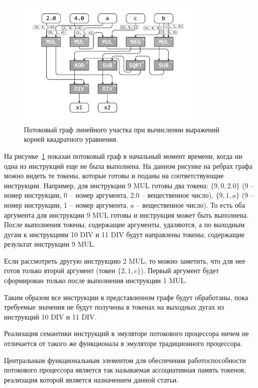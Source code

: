\documentclass[
11pt,%
tightenlines,%
twoside,%
onecolumn,%
nofloats,%
nobibnotes,%
nofootinbib,%
superscriptaddress,%
noshowpacs,%
centertags]%
{revtex4}
\begin{document}
\begin{figure}[h]
\setcaptionmargin{5mm}
\onelinecaptionsfalse %
\includegraphics[width=0.80\textwidth]{pics/dataflow.pdf}
\caption{Потоковый граф линейного участка при вычислении выражений\\ корней квадратного уравнения.}\label{fig:dataflow}
\end{figure}

На рисунке~\ref{fig:dataflow} показан потоковый граф в начальный момент времени, когда ни одна из инструкций еще не была выполнена.
На данном рисунке на ребрах графа можно видеть те токены, которые готовы и поданы на соответствующие инструкции.
Например, для инструкции 9 MUL готовы два токена: $\{9, 0, 2.0\}$ (9 -- номер инструкции, 0 -- номер аргумента, 2.0 -- вещественное число), $\{9, 1, a\}$ (9 -- номер инструкции, 1 -- номер аргумента, $a$ -- вещественное число).
То есть оба аргумента для инструкции 9 MUL готовы и инструкция может быть выполнена.
После выполнения токены, содержащие аргументы, удаляются, а по выходным дугам к инструкциям 10 DIV и 11 DIV будут направлены токены, содержащие результат инструкции 9 MUL.

Если рассмотреть другую инструкцию 2 MUL, то можно заметить, что для нее готов только второй аргумент (токен $\{2, 1, c\}$).
Первый аргумент будет сформирован только после выполнения инструкции 1 MUL.

Таким образом все инструкции в представленном графе будут обработаны, пока требуемые значения не будут получены в токенах на выходных дугах из инструкций 10 DIV и 11 DIV.

Реализация семантики инструкций в эмуляторе потокового процессора ничем не отличается от такого же функционала в эмуляторе традиционного процессора.

Центральным функциональным элементом для обеспечения работоспособности потокового процессора является так называемая ассоциативная память токенов, реализация которой является назначением данной статьи.
\end{document}
